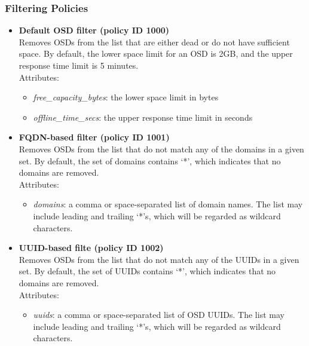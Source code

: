 \documentclass[a4paper,10pt]{book}
\begin{document}
\subsubsection{Filtering Policies}
\begin{itemize}

 \item \textbf{Default OSD filter (policy ID 1000)}\\
 Removes OSDs from the list that are either dead or do not have sufficient space. By default, the lower space limit for an OSD is 2GB, and the upper response time limit is 5 minutes.\\

 Attributes:
 \begin{itemize}
 \item \emph{free\_capacity\_bytes}: the lower space limit in bytes
 \item \emph{offline\_time\_secs}: the upper response time limit in seconds
 \end{itemize}

 \item \textbf{FQDN-based filter (policy ID 1001)}\\
 Removes OSDs from the list that do not match any of the domains in a given set. By default, the set of domains contains `*', which indicates that no domains are removed.\\

 Attributes:
 \begin{itemize}
 \item \emph{domains}: a comma or space-separated list of domain names. The list may include leading and trailing `*'s, which will be regarded as wildcard characters.
 \end{itemize}

 \item \textbf{UUID-based filte (policy ID 1002)}\\
 Removes OSDs from the list that do not match any of the UUIDs in a given set. By default, the set of UUIDs contains `*', which indicates that no domains are removed.\\

 Attributes:
 \begin{itemize}
 \item \emph{uuids}: a comma or space-separated list of OSD UUIDs. The list may include leading and trailing `*'s, which will be regarded as wildcard characters.
 \end{itemize}

\end{itemize}
\end{document}
